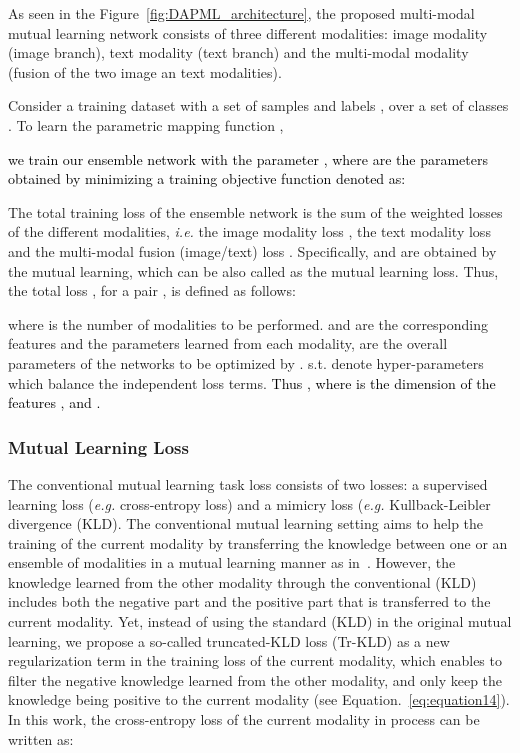 \documentclass[twocolumn]{svjour3}
\newcommand{\ie}{\textit{i.e. }}
\newcommand{\eg}{\textit{e.g. }}
\begin{document}
As seen in the Figure~\ref{fig:DAPML_architecture}, the proposed multi-modal mutual learning network consists of three different modalities: image modality (image branch), text modality (text branch) and the multi-modal modality (fusion of the two image an text modalities). 

Consider a training dataset with a set of samples and labels , over a set of  classes . To learn the parametric mapping function , \textcolor{black}{we train our ensemble network with the parameter , where  are the parameters obtained by minimizing a training objective function  denoted as: 

}
The total training loss of the ensemble network  is the sum of the weighted losses of the different modalities, \ie the image modality loss , the text modality loss  and the multi-modal fusion (image/text) loss . Specifically,  and  are obtained by the mutual learning, which can be also called as the mutual learning loss. Thus, the total loss , for a pair , is defined as follows:




where  is the number of modalities to be performed.  and  are the corresponding features and the parameters learned from each modality,  are the overall parameters of the networks to be optimized by .  s.t.  denote hyper-parameters which balance the independent loss terms. \textcolor{black}{Thus , where  is the dimension of the features , and .}

\subsubsection{Mutual Learning Loss}

The conventional mutual learning task loss consists of two losses: a supervised learning loss (\eg cross-entropy loss) and a mimicry loss (\eg Kullback-Leibler divergence (KLD). The conventional mutual learning setting aims to help the training of the current modality by transferring the knowledge between one or an ensemble of modalities in a mutual learning manner as in~\cite{zhang2018deep}. However, the knowledge learned from the other modality through the conventional (KLD) includes both the negative part and the positive part that is transferred to the current modality. Yet, instead of using the standard (KLD) in the original mutual learning, we propose a so-called truncated-KLD loss (Tr-KLD) as a new regularization term in the training loss of the current modality, which enables to filter the negative knowledge learned from the other modality, and only keep the knowledge being positive to the current modality (see Equation.~\ref{eq:equation14}). In this work, the cross-entropy loss  of the current modality in process can be written as:
\end{document}
